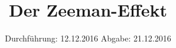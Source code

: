 

\subject{Versuch 27}
\title{Der Zeeman-Effekt}
\date{
  Durchführung: 12.12.2016
  \hspace{3em}
  Abgabe: 21.12.2016
}



\listoftodos

\maketitle
\thispagestyle{empty}
\tableofcontents
\newpage






\printbibliography


